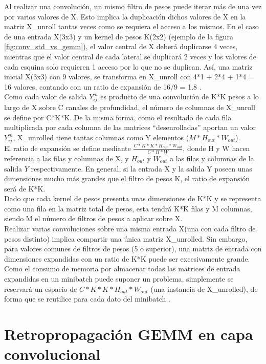 Al realizar una convolución, un mismo filtro de pesos puede iterar más de una vez por varios valores de X. Esto implica la duplicación dichos valores de X en la matriz X\_unroll tantas veces como se requiera el acceso a los mismos. En el caso de una entrada X(3x3) y un kernel de pesos K(2x2) (ejemplo de la figura \ref{fig:conv_std_vs_gemm}), el valor central de X deberá duplicarse 4 veces, mientras que el valor central de cada lateral se duplicará 2 veces y los valores de cada esquina solo requieren 1 acceso por lo que no  se duplican. Así, una matriz inicial X(3x3) con 9 valores, se transforma en X\_unroll con 4*1 + 2*4 + 1*4 = 16 valores, contando con un ratio de expansión de 16/9 = 1.8 . \\
 Como cada valor de salida $Y^m_{ij}$ es producto de una convolución de K*K pesos a lo largo de X sobre C canales de profundidad, el número de columnas de X\_unroll se define por C*K*K. De la misma forma, como el resultado de cada fila multiplicada por cada columna de las matrices ``desenrolladas'' aportan un valor $Y^m_{ij}$, X\_unrolled tiene tantas columnas como Y elementos ($M*H_{out}*W_{out}$). \\
 El ratio de expansión se define mediante $\frac{C*K*K*H_{out}*W_{out}}{C*H*W}$, donde H y W hacen referencia a las filas y columnas de X, y $H_{out}$ y $W_{out}$ a las filas y columnas de la salida $Y$ respectivamente. En general, si la entrada X y la salida Y poseen unas dimensiones mucho más grandes que el filtro de pesos K, el ratio de expansión será de K*K. \\
 Dado que cada kernel de pesos presenta unas dimensiones de K*K y se representa como una fila en la matriz total de pesos, esta tendrá K*K filas y M columnas, siendo M el número de filtros de pesos a aplicar sobre X. \\
 Realizar varias convoluciones sobre una misma entrada X(una con cada filtro de pesos distinto) implica compartir una única matriz X\_unrolled. Sin embargo, para valores comunes de filtros de pesos (5 o superior), una matriz de entrada con dimensiones expandidas con un ratio de K*K puede ser excesivamente grande. Como el consumo de memoria por almacenar todas las matrices de entrada expandidas en un minibatch puede suponer un problema, simplemente se reservará un espacio de $C*K*K*H_{out}*W_{out}$ (una instancia de X\_unrolled), de forma que se reutilice para cada dato del minibatch \cite{Programming_Massively}.

\section{Retropropagación GEMM en capa convolucional}

